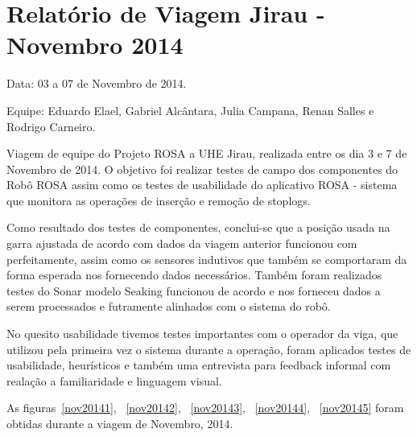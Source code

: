 \section{Relatório de Viagem Jirau - Novembro 2014}
Data: 03 a 07 de Novembro de 2014.

Equipe: Eduardo Elael, Gabriel Alcântara, Julia Campana, Renan Salles e Rodrigo Carneiro.


Viagem de equipe do Projeto ROSA a UHE Jirau, realizada entre
os dia 3 e 7 de Novembro de 2014. O objetivo foi realizar testes de campo dos
componentes do Robô ROSA assim como os testes de usabilidade do aplicativo ROSA
- sistema que monitora as operações de inserção e remoção de stoplogs.

Como resultado dos testes de componentes, conclui-se que a posição usada na
garra ajustada de acordo com dados da viagem anterior funcionou com
perfeitamente, assim como  os sensores indutivos que também se comportaram da
forma esperada nos fornecendo dados necessários.  Também foram realizados
testes do Sonar modelo Seaking funcionou de acordo e nos forneceu dados a serem
processados e futramente alinhados com o sistema do robô.

No quesito usabilidade tivemos testes importantes com o operador da viga, que
utilizou pela primeira vez o sistema durante a operação, foram aplicados
testes de usabilidade, heurísticos e também uma entrevista para feedback
informal com realação a familiaridade e linguagem visual.

As figuras~\ref{nov20141}, ~\ref{nov20142}, ~\ref{nov20143}, ~\ref{nov20144},
~\ref{nov20145} foram obtidas durante a viagem de Novembro, 2014.


